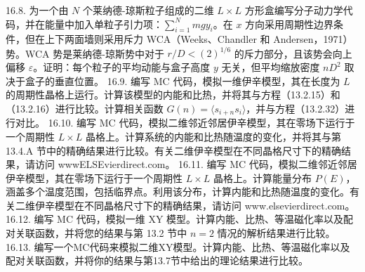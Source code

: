 16.8. 为一个由 \(N\) 个莱纳德-琼斯粒子组成的二维 \(L \times L\) 方形盒编写分子动力学代码，并在能量中加入单粒子引力项：\(\sum_{i=1}^{N} mgy_{i}\)。在 \(x\) 方向采用周期性边界条件，但在上下两面墙则采用斥力 WCA（Weeks、Chandler 和 Andersen，1971）势。WCA 势是莱纳德-琼斯势中对于 \(r/D < (2)^{1/6}\) 的斥力部分，且该势会向上偏移 \(\varepsilon\)。证明：每个粒子的平均动能与盒子高度 \(y\) 无关，但平均缩放密度 \(nD^{2}\) 取决于盒子的垂直位置。
16.9. 编写 MC 代码，模拟一维伊辛模型，其在长度为 \(L\) 的周期性晶格上运行。计算该模型的内能和比热，并将其与方程（13.2.15）和（13.2.16）进行比较。计算相关函数 \(G(n)=\langle s_{i+n}s_{i}\rangle\)，并与方程（13.2.32）进行对比。
16.10. 编写 MC 代码，模拟二维邻近邻居伊辛模型，其在零场下运行于一个周期性 \(L \times L\) 晶格上。计算系统的内能和比热随温度的变化，并将其与第 13.4.A 节中的精确结果进行比较。有关二维伊辛模型在不同晶格尺寸下的精确结果，请访问 wwwELSEvierdirect.com。
16.11. 编写 MC 代码，模拟二维邻近邻居伊辛模型，其在零场下运行于一个周期性 \(L \times L\) 晶格上。计算能量分布 \(P(E)\)，涵盖多个温度范围，包括临界点。利用该分布，计算内能和比热随温度的变化。有关二维伊辛模型在不同晶格尺寸下的精确结果，请访问 www.elsevierdirect.com。
16.12. 编写 MC 代码，模拟一维 XY 模型。计算内能、比热、等温磁化率以及配对关联函数，并将您的结果与第 13.2 节中 \(n=2\) 情况的解析结果进行比较。
16.13. 编写一个MC代码来模拟二维XY模型。计算内能、比热、等温磁化率以及配对关联函数，并将你的结果与第13.7节中给出的理论结果进行比较。



